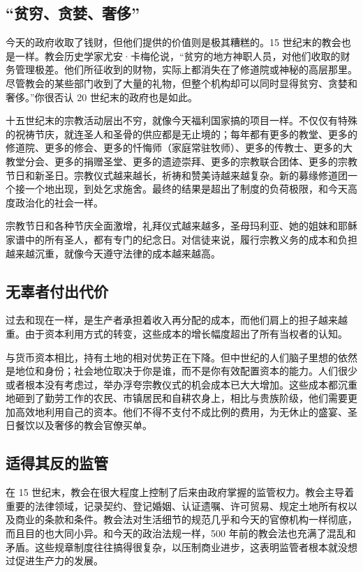 \subsection{“贫穷、贪婪、奢侈”}
今天的政府收取了钱财，但他们提供的价值则是极其糟糕的。15 世纪末的教会也是一样。教会历史学家尤安·卡梅伦说，“贫穷的地方神职人员，对他们收取的财务管理极差。他们所征收到的财物，实际上都消失在了修道院或神秘的高层那里。尽管教会的某些部门收到了大量的礼物，但整个机构却可以同时显得贫穷、贪婪和奢侈。”你很否认 20 世纪末的政府也是如此。

十五世纪末的宗教活动层出不穷，就像今天福利国家搞的项目一样。不仅仅有特殊的祝祷节庆，就连圣人和圣骨的供应都是无止境的；每年都有更多的教堂、更多的修道院、更多的修会、更多的忏悔师（家庭常驻牧师）、更多的传教士、更多的大教堂分会、更多的捐赠圣堂、更多的遗迹崇拜、更多的宗教联合团体、更多的宗教节日和新圣日。宗教仪式越来越长，祈祷和赞美诗越来越复杂。新的募缘修道团一个接一个地出现，到处乞求施舍。最终的结果是超出了制度的负荷极限，和今天高度政治化的社会一样。

宗教节日和各种节庆全面激增，礼拜仪式越来越多，圣母玛利亚、她的姐妹和耶稣家谱中的所有圣人，都有专门的纪念日。对信徒来说，履行宗教义务的成本和负担越来越沉重，就像今天遵守法律的成本越来越高。

\subsection{无辜者付出代价}
过去和现在一样，是生产者承担着收入再分配的成本，而他们肩上的担子越来越重。由于资本利用方式的转变，这些成本的增长幅度超出了所有当权者的认知。

与货币资本相比，持有土地的相对优势正在下降。但中世纪的人们脑子里想的依然是地位和身份；社会地位取决于你是谁，而不是你有效配置资本的能力。人们很少或者根本没有考虑过，举办浮夸宗教仪式的机会成本已大大增加。这些成本都沉重地砸到了勤劳工作的农民、市镇居民和自耕农身上，相比与贵族阶级，他们需要更加高效地利用自己的资本。他们不得不支付不成比例的费用，为无休止的盛宴、圣日餐饮以及奢侈的教会官僚买单。

\subsection{适得其反的监管}
在 15 世纪末，教会在很大程度上控制了后来由政府掌握的监管权力。教会主导着重要的法律领域，记录契约、登记婚姻、认证遗嘱、许可贸易、规定土地所有权以及商业的条款和条件。教会法对生活细节的规范几乎和今天的官僚机构一样彻底，而且目的也大同小异。和今天的政治法规一样，500 年前的教会法也充满了混乱和矛盾。这些规章制度往往搞得很复杂，以压制商业进步，这表明监管者根本就没想过促进生产力的发展。

